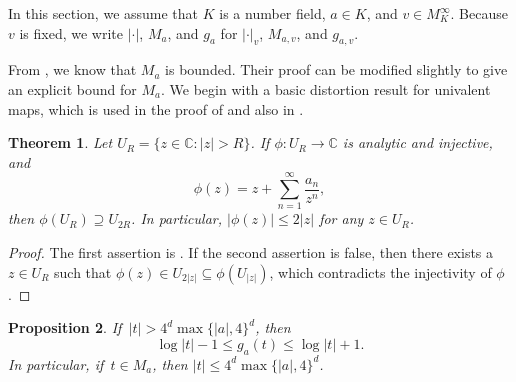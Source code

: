 \documentclass[10pt,a4paper]{amsart}
\numberwithin{equation}{section}
\theoremstyle{plain}
\newtheorem{thm}{Theorem}[section]
\newtheorem{prop}[thm]{Proposition}
\theoremstyle{definition}
\theoremstyle{remark}
\newcommand{\C}{\mathbb C}
\begin{document}
In this section, we assume that $K$ is a number field, $a\in K$,
and $v\in M_{K}^{\infty}$. Because $v$ is fixed, we write $|\cdot|$,
$M_{a}$, and $g_{a}$ for $|\cdot|_{v}$, $M_{a,v}$, and $g_{a,v}$.

From \cite[Lemma 3.2]{BD1}, we know that $M_{a}$ is bounded. Their
proof can be modified slightly to give an explicit bound for $M_{a}$.
We begin with a basic distortion result for univalent maps, which
is used in the proof of \cite[Lemma 3.2]{BD1} and also in \cite[Section 3.1]{DKY2}.

\begin{thm}\label{thm3.1}
Let $U_{R}=\{z\in\C:|z|>R\}$. If $\phi\colon U_{R}\to\C$
is analytic and injective, and
\[
\phi(z)=z+\sum_{n=1}^{\infty}\frac{a_{n}}{z^{n}},
\]
then $\phi(U_{R})\supseteq U_{2R}$. In particular, $|\phi(z)|\leq2|z|$
for any $z\in U_{R}$.
\end{thm}

\begin{proof}
The first assertion is \cite[Corollary 3.3]{BH}. If the second assertion
is false, then there exists a $z\in U_{R}$ such that $\phi(z)\in U_{2|z|}\subseteq\phi(U_{|z|})$,
which contradicts the injectivity of $\phi$.
\end{proof}

\begin{prop}\label{prop3.2}
If\,  $|t|>4^{d}\max\{|a|,4\}^{d}$, then
\[
\log|t|-1\leq g_{a}(t)\leq\log|t|+1.
\]
In particular, if\, $t\in M_{a}$, then $|t|\leq4^{d}\max\{|a|,4\}^{d}$.
\end{prop}
\end{document}
